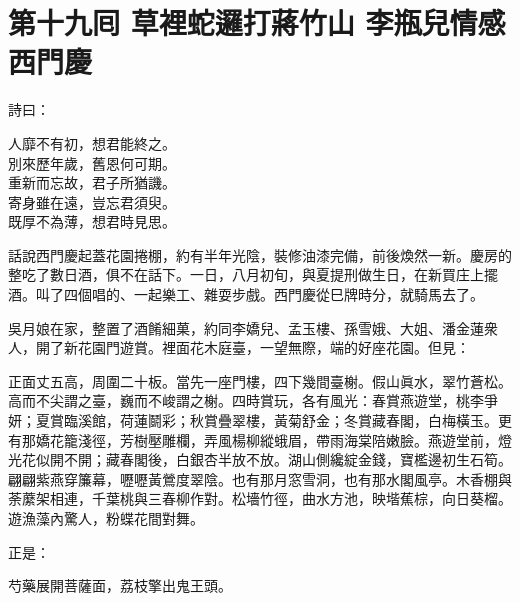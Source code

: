 
\chapter*{第十九囘 草裡蛇邏打蔣竹山 李瓶兒情感西門慶}


詩曰：

\begin{myquote}
人靡不有初，想君能終之。\\別來歷年歲，舊恩何可期。\\重新而忘故，君子所猶譏。\\寄身雖在遠，豈忘君須臾。\\既厚不為薄，想君時見思。
\end{myquote}

話說西門慶起蓋花園捲棚，約有半年光陰，裝修油漆完備，前後煥然一新。慶房的整吃了數日酒，俱不在話下。一日，八月初旬，與夏提刑做生日，在新買庄上擺酒。叫了四個唱的、一起樂工、雜耍步戲。西門慶從巳牌時分，就騎馬去了。

吳月娘在家，整置了酒餚細菓，約同李嬌兒、孟玉樓、孫雪娥、大姐、潘金蓮衆人，開了新花園門遊賞。裡面花木庭臺，一望無際，端的好座花園。但見：

\begin{myquote}
正面丈五高，周圍二十板。當先一座門樓，四下幾間臺榭。假山眞水，翠竹蒼松。高而不尖謂之臺，巍而不峻謂之榭。四時賞玩，各有風光：春賞燕遊堂，桃李爭妍；夏賞臨溪館，荷蓮鬬彩；秋賞疊翠樓，黃菊舒金；冬賞藏春閣，白梅橫玉。更有那嬌花籠淺徑，芳樹壓雕欄，弄風楊柳縱蛾眉，帶雨海棠陪嫩臉。燕遊堂前，燈光花似開不開；藏春閣後，白銀杏半放不放。湖山側纔綻金錢，寶檻邊初生石筍。翩翩紫燕穿簾幕，嚦嚦黃鶯度翠陰。也有那月窓雪洞，也有那水閣風亭。木香棚與荼䕷架相連，千葉桃與三春柳作對。松墻竹徑，曲水方池，映堦蕉棕，向日葵榴。遊漁藻內驚人，粉蝶花間對舞。
\end{myquote}

正是：

\begin{myquote}
芍藥展開菩薩面，荔枝擎出鬼王頭。
\end{myquote}

